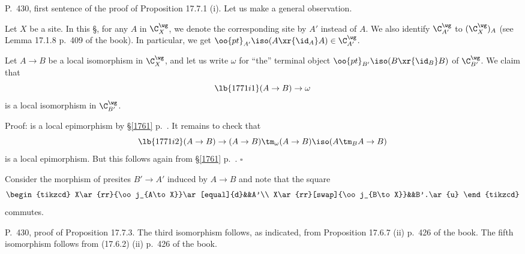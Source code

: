 \documentclass[12pt]{article}
\theoremstyle{remark}
\theoremstyle{definition}
\begin{document}
\begin{s} 
P.~430, first sentence of the proof of Proposition 17.7.1 (i). Let us make a general observation. 

Let $X$ be a site. In this \S, for any $A$ in $\C_X^\wg$, we denote the corresponding site by $A'$ instead of $A$. We also identify $\C_{A'}^\wg$ to $(\C_X^\wg)_A$ (see Lemma 17.1.8 p.~409 of the book). In particular, we get $\oo{pt}_{A'}\iso(A\xr{\id_A}A)\in\C_{A'}^\wg$. 

Let $A\to B$ be a local isomorphism in $\C_X^\wg$, and let us write $\omega$ for ``the'' terminal object $\oo{pt}_{B'}\iso(B\xr{\id_B}B)$ of $\C_{B'}^\wg$. We claim that 
\begin{equation}\lb{1771i1}
(A\to B)\to\omega 
\end{equation} 
is a local isomorphism in $\C_{B'}^\wg$.

Proof:  is a local epimorphism by \S\ref{1761} p.~. It remains to check that 
\begin{equation}\lb{1771i2}
(A\to B)\to(A\to B)\tm_\omega(A\to B)\iso(A\tm_BA\to B)
\end{equation} 
is a local epimorphism. But this follows again from \S\ref{1761} p.~. $\square$ 

Consider the morphism of presites $B'\to A'$ induced by $A\to B$ and note that the square
$$
\begin{tikzcd} 
X\ar{rr}{\oo j_{A\to X}}\ar[equal]{d}&&A'\\ 
X\ar{rr}[swap]{\oo j_{B\to X}}&&B'.\ar{u}
\end{tikzcd}
$$ 
commutes.
\end{s} 

%

\begin{s} 
P.~430, proof of Proposition 17.7.3. The third isomorphism follows, as indicated, from Proposition 17.6.7 (ii) p.~426 of the book. The fifth isomorphism follows from (17.6.2) (ii) p.~426 of the book. 
\end{s} 

%
\end{document}
